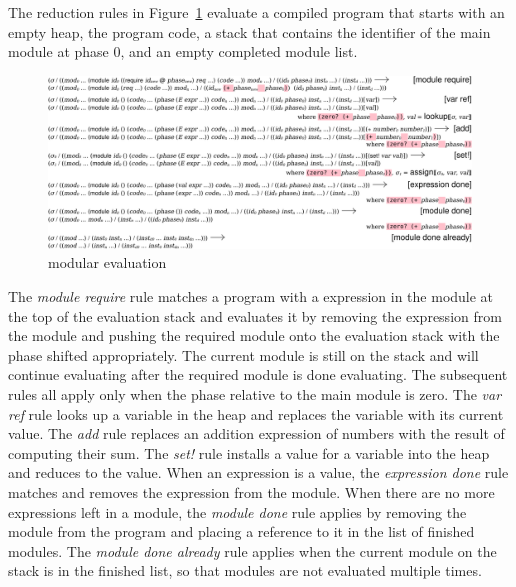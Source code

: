 \documentclass[ms,electronic,letterpaper,lol,lof,lot]{byumsphd}
\begin{document}
The reduction rules in Figure~\ref{eval-reduction} evaluate a compiled program that starts with an empty heap, the program code, a stack that contains the identifier of the main module at phase 0, and an empty completed module list. 

\begin{figure}[h]
\includegraphics[width=\textwidth]{eval-reduction}
\caption{modular evaluation}
\label{eval-reduction}
\end{figure}

The \emph{module require} rule matches a program with a  expression in the module at the top of the evaluation stack and evaluates it by removing the  expression from the module and pushing the required module onto the evaluation stack with the phase shifted appropriately.
The current module is still on the stack and will continue evaluating after the required module is done evaluating.
The subsequent rules all apply only when the phase relative to the main module is zero.
The \emph{var ref} rule looks up a variable in the heap and replaces the variable with its current value.
The \emph{add} rule replaces an addition expression of numbers with the result of computing their sum.
The \emph{set!} rule installs a value for a variable into the heap and reduces to the value.
When an expression is a value, the \emph{expression done} rule matches and removes the expression from the module.
When there are no more expressions left in a module, the \emph{module done} rule applies by removing the module from the program and placing a reference to it in the list of finished modules.
The \emph{module done already} rule applies when the current module on the stack is in the finished list, so that modules are not evaluated multiple times. 
\end{document}
